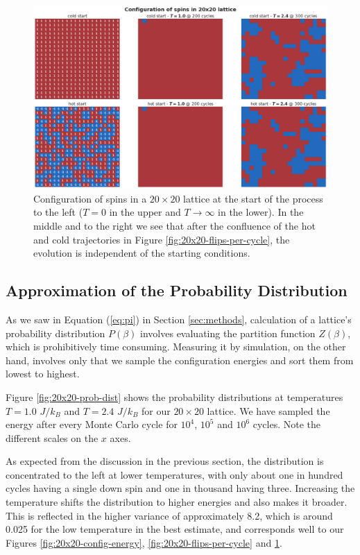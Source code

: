 \documentclass[]{article}
\begin{document}
\begin{figure}[!h]
	\centering
	\includegraphics[width=1\linewidth]{./figs/20x20-config-spins.png}
	\caption{Configuration of spins in a $20 \times 20$ lattice at the start of the process to the left ($T=0$ in the upper and $T \rightarrow \infty$ in the lower). In the middle and to the right we see that after the confluence of the hot and cold trajectories in Figure \ref{fig:20x20-flips-per-cycle}, the evolution is independent of the starting conditions.}
	\label{fig:20x20-config-spins}
\end{figure}

\subsection{Approximation of the Probability Distribution} \label{sec:equilibration}
As we saw in Equation (\ref{eq:pi}) in Section \ref{sec:methods}, calculation of a lattice's probability distribution $P(\beta)$ involves evaluating the partition function $Z(\beta)$, which is prohibitively time consuming. Measuring it by simulation, on the other hand, involves only that we sample the configuration energies and sort them from lowest to highest.

Figure \ref{fig:20x20-prob-dist} shows the probability distributions at temperatures $T = 1.0$ $J/k_B$ and $T = 2.4$ $J/k_B$ for our $20 \times 20$ lattice. We have sampled the energy after every Monte Carlo cycle for $10^4$, $10^5$ and $10^6$ cycles. Note the different scales on the $x$ axes. 

As expected from the discussion in the previous section, the distribution is concentrated to the left at lower temperatures, with only about one in hundred cycles having a single down spin and one in thousand having three. Increasing the temperature shifts the distribution to higher energies and also makes it broader. This is reflected in the higher variance of approximately 8.2, which is around 0.025 for the low temperature in the best estimate, and corresponds well to our Figures \ref{fig:20x20-config-energy}, \ref{fig:20x20-flips-per-cycle} and \ref{fig:20x20-config-spins}.
\end{document}
